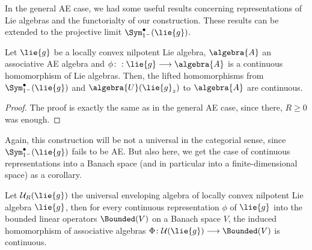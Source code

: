 In the general AE case, we had some useful results concerning representations 
of Lie algebras and the functorialty of our construction. These results can be 
extended to the projective limit $\Sym_{1^-}^{\bullet}(\lie{g})$.
\begin{proposition}
	\label{Nilpot:Prop:UnivProperty}
	Let $\lie{g}$ be a locally convex nilpotent Lie algebra, $\algebra{A}$ an 
	associative AE algebra and $\phi \colon: \lie{g} \longrightarrow 
	\algebra{A}$ is a continuous homomorphism of Lie algebras. Then, the 
	lifted homomorphisms from $\Sym_{1^-}^{\bullet}(\lie{g})$ and 
	$\algebra{U}(\lie{g}_z)$ to $\algebra{A}$ are continuous.
\end{proposition}
\begin{proof}
	The proof is exactly the same as in the general AE case, since there, 
	$R \geq 0$ was enough.
\end{proof}
Again, this construction will be not a universal in the categorial sense, 
since $\Sym_{1^-}^{\bullet}(\lie{g})$ fails to be AE. But also here, we get 
the case of continuous representations into a Banach space (and in particular 
into a finite-dimensional space) as a corollary.
\begin{corollary}
    \label{Nilpot:Coro:ContinuousRepresentations}%
    Let $\mathcal{U}_R(\lie{g})$ the universal enveloping algebra of locally 
    convex nilpotent Lie algebra $\lie{g}$, then for every continuous 
    representation $\phi$ of $\lie{g}$ into the bounded linear operators 
    $\Bounded(V)$ on a Banach space $V$, the induced homomorphism of 
    associative algebras $\Phi \colon \mathcal{U}(\lie{g}) \longrightarrow 
    \Bounded(V)$ is continuous.
\end{corollary}



